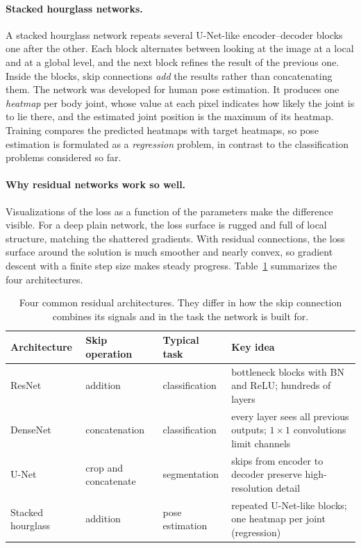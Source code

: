 \paragraph{Stacked hourglass networks.}
A stacked hourglass network repeats several U-Net-like encoder--decoder blocks
one after the other. Each block alternates between looking at the image at a
local and at a global level, and the next block refines the result of the
previous one. Inside the blocks, skip connections \emph{add} the results rather
than concatenating them. The network was developed for human pose estimation.
It produces one \emph{heatmap} per body joint, whose value at each pixel
indicates how likely the joint is to lie there, and the estimated joint position
is the maximum of its heatmap. Training compares the predicted heatmaps with
target heatmaps, so pose estimation is formulated as a \emph{regression}
problem, in contrast to the classification problems considered so far.

\paragraph{Why residual networks work so well.}
Visualizations of the loss as a function of the parameters make the difference
visible. For a deep plain network, the loss surface is rugged and full of
local structure, matching the shattered gradients. With residual connections,
the loss surface around the solution is much smoother and nearly convex, so
gradient descent with a finite step size makes steady progress.
Table~\ref{tab:residual-archs} summarizes the four architectures.

\begin{table}[ht]
  \centering
  \begin{tabular}{@{}p{2.8cm}p{3.0cm}p{2.8cm}p{6.0cm}@{}}
    \toprule
    Architecture & Skip operation & Typical task & Key idea \\
    \midrule
    ResNet & addition & classification & bottleneck blocks with BN and ReLU;
      hundreds of layers \\
    DenseNet & concatenation & classification & every layer sees all previous
      outputs; $1\times1$ convolutions limit channels \\
    U-Net & crop and concatenate & segmentation & skips from encoder to decoder
      preserve high-resolution detail \\
    Stacked hourglass & addition & pose estimation & repeated U-Net-like blocks;
      one heatmap per joint (regression) \\
    \bottomrule
  \end{tabular}
  \caption{Four common residual architectures. They differ in how the skip
  connection combines its signals and in the task the network is built for.}
  \label{tab:residual-archs}
\end{table}
